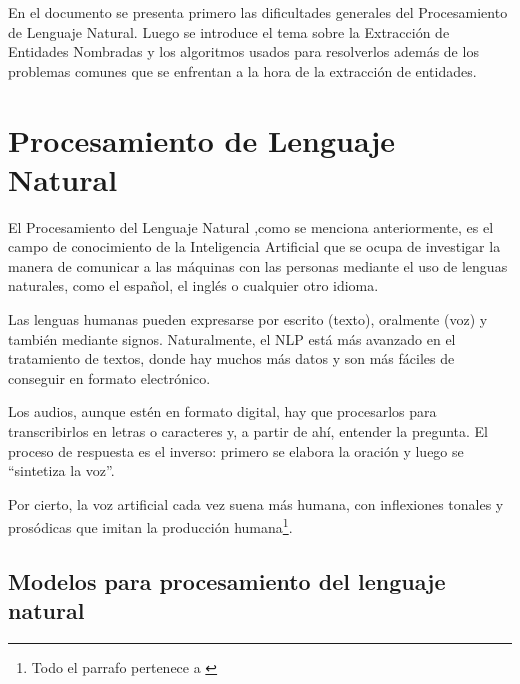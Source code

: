 \documentclass[runningheads]{llncs}
\begin{document}
En el documento se presenta primero las dificultades generales del Procesamiento de Lenguaje Natural. Luego se introduce el tema sobre la Extracción de Entidades Nombradas y los algoritmos usados para resolverlos además de los problemas comunes que se enfrentan a la hora de la extracción de entidades.

\section{Procesamiento de Lenguaje Natural}

El Procesamiento del Lenguaje Natural ,como se menciona anteriormente, es el campo de conocimiento de la Inteligencia Artificial que se ocupa de investigar la manera de comunicar a las máquinas con las personas mediante el uso de lenguas naturales, como el español, el inglés o cualquier 
otro idioma.

Las lenguas humanas pueden expresarse por escrito (texto), oralmente (voz) y también mediante signos. Naturalmente, el NLP está más avanzado en el tratamiento de textos, donde hay muchos más datos y son más fáciles de conseguir en formato electrónico.

Los audios, aunque estén en formato digital, hay que procesarlos para transcribirlos en letras o caracteres y, a partir de ahí, entender la pregunta. El proceso de respuesta es el inverso: primero se elabora la oración y luego se “sintetiza la voz”.

Por cierto, la voz artificial cada vez suena más humana, con inflexiones tonales y prosódicas que imitan la producción humana\footnote{Todo el parrafo pertenece a \cite{nlp}}.



\subsection{Modelos para procesamiento del lenguaje natural}
\end{document}
